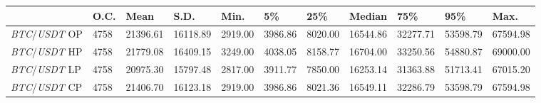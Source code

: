 \begin{tabular}{lllllllllll}
\toprule
 & \textbf{O.C.} & \textbf{Mean} & \textbf{S.D.} & \textbf{Min.} & \textbf{5\%} & \textbf{25\%} & \textbf{Median} & \textbf{75\%} & \textbf{95\%} & \textbf{Max.} \\
\midrule
\emph{BTC}/\emph{USDT} OP & 4758 & 21396.61 & 16118.89 & 2919.00 & 3986.86 & 8020.00 & 16544.86 & 32277.71 & 53598.79 & 67594.98 \\
\emph{BTC}/\emph{USDT} HP & 4758 & 21779.08 & 16409.15 & 3249.00 & 4038.05 & 8158.77 & 16704.00 & 33250.56 & 54880.87 & 69000.00 \\
\emph{BTC}/\emph{USDT} LP & 4758 & 20975.30 & 15797.48 & 2817.00 & 3911.77 & 7850.00 & 16253.14 & 31363.88 & 51713.41 & 67015.20 \\
\emph{BTC}/\emph{USDT} CP & 4758 & 21406.70 & 16123.18 & 2919.00 & 3986.86 & 8021.36 & 16549.11 & 32286.79 & 53598.79 & 67594.98 \\
\bottomrule
\end{tabular}
